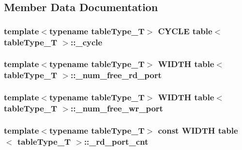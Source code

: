 \subsection{Member Data Documentation}
\hypertarget{classtable_a64d740f2c6bbb938aac4a89bcbd76674}{
\subsubsection[{\_\-cycle}]{\setlength{\rightskip}{0pt plus 5cm}template$<$typename tableType\_\-T$>$ {\bf CYCLE} {\bf table}$<$ tableType\_\-T $>$::{\bf \_\-cycle}}}
\label{classtable_a64d740f2c6bbb938aac4a89bcbd76674}
\hypertarget{classtable_a81119aad0ba83d08ba21cd6d0d040347}{
\subsubsection[{\_\-num\_\-free\_\-rd\_\-port}]{\setlength{\rightskip}{0pt plus 5cm}template$<$typename tableType\_\-T$>$ {\bf WIDTH} {\bf table}$<$ tableType\_\-T $>$::{\bf \_\-num\_\-free\_\-rd\_\-port}}}
\label{classtable_a81119aad0ba83d08ba21cd6d0d040347}
\hypertarget{classtable_aa4bac855debc70614138237634c81bcd}{
\subsubsection[{\_\-num\_\-free\_\-wr\_\-port}]{\setlength{\rightskip}{0pt plus 5cm}template$<$typename tableType\_\-T$>$ {\bf WIDTH} {\bf table}$<$ tableType\_\-T $>$::{\bf \_\-num\_\-free\_\-wr\_\-port}}}
\label{classtable_aa4bac855debc70614138237634c81bcd}
\hypertarget{classtable_a91630e4de8867734d127999fcfd60fa6}{
\subsubsection[{\_\-rd\_\-port\_\-cnt}]{\setlength{\rightskip}{0pt plus 5cm}template$<$typename tableType\_\-T$>$ const {\bf WIDTH} {\bf table}$<$ tableType\_\-T $>$::{\bf \_\-rd\_\-port\_\-cnt}}}
\label{classtable_a91630e4de8867734d127999fcfd60fa6}
